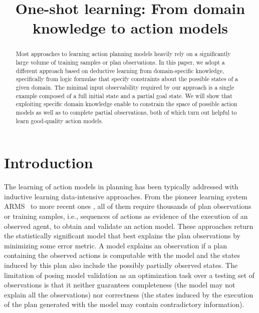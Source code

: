 \documentclass{article}
\title{One-shot learning: From domain knowledge to action models}
\newcommand{\ARMS}{{\small {\sffamily ARMS}}\xspace}
\begin{document}
\maketitle


\begin{abstract}
Most approaches to learning action planning models heavily rely on a significantly large volume of training samples or plan observations. In this paper, we adopt a different approach based on deductive learning from domain-specific knowledge, specifically from logic formulae that specify constraints about the possible states of a given domain. The minimal input observability required by our approach is a single example composed of a full initial state and a partial goal state. We will show that exploiting specific domain knowledge enable to constrain the space of possible action models as well as to complete partial observations, both of which turn out helpful to learn good-quality action models.
 \end{abstract}



\section{Introduction}
\label{sec:introduction}

The learning of action models in planning has been typically addressed with inductive learning data-intensive approaches. From the pioneer learning system \ARMS~\cite{yang2007learning} to more recent ones \cite{MouraoZPS12,zhuo2013action,kuvcera2018louga}, all of them require thousands of plan observations or training samples, i.e., sequences of actions as evidence of the execution of an observed agent, to obtain and validate an action model. These approaches return the statistically significant model that best explains the plan observations by minimizing some error metric. A model explains an observation if a plan containing the observed actions is computable with the model and the states induced by this plan also include the possibly partially observed states. The limitation of posing model validation as an optimization task over a testing set of observations is that it neither guarantees completeness (the model may not explain all the observations) nor correctness (the states induced by the execution of the plan generated with the model may contain contradictory information).
\end{document}
